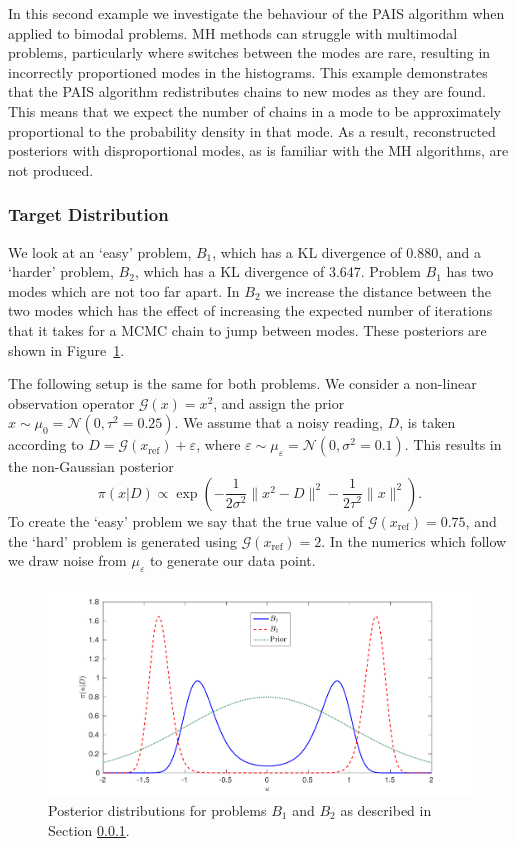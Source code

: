 \documentclass[final]{siamltex}
\newcommand{\G}{\mathcal{G}}
\newcommand{\N}{\mathcal{N}}
\begin{document}
In this second example we investigate the behaviour of the PAIS algorithm
when applied to bimodal problems. MH methods can
struggle with multimodal problems, particularly where switches between
the modes are rare, resulting in incorrectly proportioned modes in the
histograms. This example demonstrates that the PAIS algorithm redistributes 
chains to new modes as they are found. This means that we expect the number of chains in a mode to be
approximately proportional to the probability density in that mode. As a result, reconstructed posteriors with disproportional modes, as is familiar with the MH algorithms, are not produced.

\subsubsection{Target Distribution} \label{sec:tar}

We look at an `easy' problem, $B_1$, which has a KL divergence of
0.880, and a `harder' problem, $B_2$, which has a KL divergence of
3.647. Problem $B_1$ has two modes which are not too far apart. In
$B_2$ we increase the distance between the two modes which has the
effect of increasing the expected number of iterations that it takes
for a MCMC chain to jump between modes. These posteriors are shown in Figure~\ref{fig:problem 3 posteriors}.

The following setup is the same for both problems. We consider a
non-linear observation operator $\G(x) = x^2$, and assign the prior
$x \sim \mu_0 = \N(0, \tau^2=0.25)$. We assume that a noisy reading,
$D$, is taken according to $D = \G(x_\text{ref}) + \varepsilon$, where
$\varepsilon \sim \mu_\varepsilon = \N(0, \sigma^2 = 0.1)$. This results
in the non-Gaussian posterior
\[
	\pi(x|D) \propto \exp\left(-\frac{1}{2\sigma^2}\|x^2 - D\|^2 - \frac{1}{2\tau^2}\|x\|^2\right).
\]
To create the `easy' problem we say that the true value of
$\G(x_\text{ref}) = 0.75$, and the `hard' problem is generated using
$\G(x_\text{ref}) = 2$. In the numerics which follow we draw noise from
$\mu_\varepsilon$ to generate our data point.

\begin{figure}[htpb]
\begin{center}
\includegraphics[width=\textwidth]{"figures/posteriors3"}
\caption{Posterior distributions for problems $B_1$ and $B_2$ as
  described in Section \ref{sec:tar}.}
\label{fig:problem 3 posteriors}
\end{center}
\end{figure}
\end{document}
